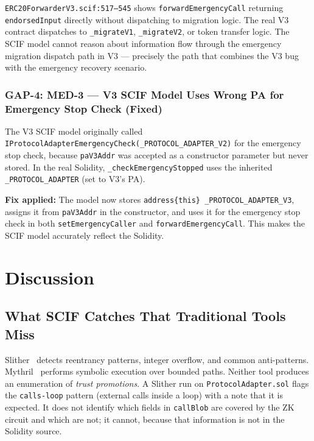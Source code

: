 \documentclass[11pt,a4paper]{article}
\begin{document}
\texttt{ERC20ForwarderV3.scif:517--545} shows \texttt{forwardEmergencyCall}
returning \texttt{endorsedInput} directly without dispatching to migration logic.
The real V3 contract dispatches to \texttt{\_migrateV1}, \texttt{\_migrateV2},
or token transfer logic. The SCIF model cannot reason about information flow
through the emergency migration dispatch path in V3 --- precisely the path that
combines the V3 bug with the emergency recovery scenario.

\subsubsection{GAP-4: MED-3 --- V3 SCIF Model Uses Wrong PA for Emergency Stop Check (Fixed)}

The V3 SCIF model originally called
\texttt{IProtocolAdapterEmergencyCheck(\allowbreak{}\_PROTOCOL\_ADAPTER\_V2)}
for the emergency stop check, because \texttt{paV3Addr} was accepted as a
constructor parameter but never stored.  In the real Solidity,
\texttt{\_checkEmergencyStopped} uses the inherited
\texttt{\_PROTOCOL\_ADAPTER} (set to V3's PA).

\textbf{Fix applied:} The model now stores
\texttt{address\{this\} \_PROTOCOL\_ADAPTER\_V3}, assigns it from
\texttt{paV3Addr} in the constructor, and uses it for the emergency stop check
in both \texttt{setEmergencyCaller} and \texttt{forwardEmergencyCall}.
This makes the SCIF model accurately reflect the Solidity.

\section{Discussion}
\label{sec:discussion}

\subsection{What SCIF Catches That Traditional Tools Miss}

Slither~\cite{slither} detects reentrancy patterns, integer overflow, and
common anti-patterns.
Mythril~\cite{mythril} performs symbolic execution over bounded paths.
Neither tool produces an
enumeration of \emph{trust promotions}. A Slither run on \texttt{ProtocolAdapter.sol}
flags the \texttt{calls-loop} pattern (external calls inside a loop) with a
note that it is expected. It does not identify which fields in \texttt{callBlob}
are covered by the ZK circuit and which are not; it cannot, because that
information is not in the Solidity source.
\end{document}
